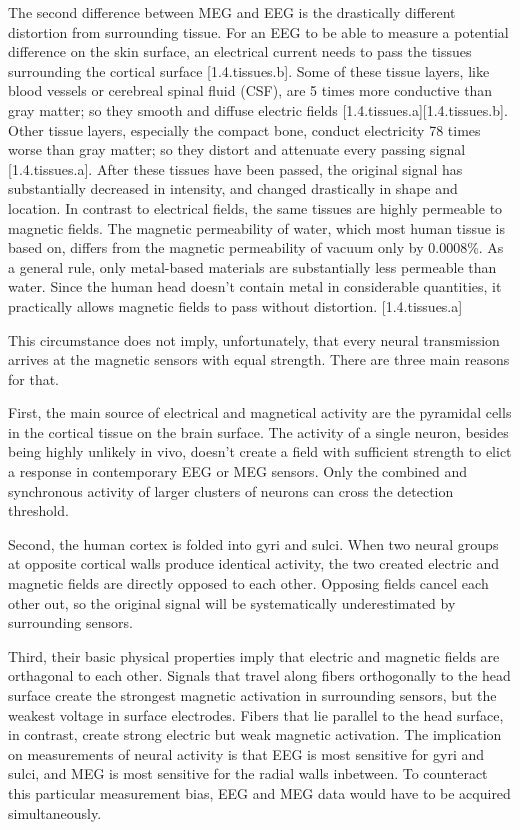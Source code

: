The second difference between MEG and EEG is the drastically different distortion from surrounding tissue.
For an EEG to be able to measure a potential difference on the skin surface, an electrical current needs to pass the tissues surrounding the cortical surface [1.4.tissues.b].
Some of these tissue layers, like blood vessels or cerebreal spinal fluid (CSF), are 5 times more conductive than gray matter; so they smooth and diffuse electric fields [1.4.tissues.a][1.4.tissues.b].
Other tissue layers, especially the compact bone, conduct electricity 78 times worse than gray matter; so they distort and attenuate every passing signal [1.4.tissues.a].
After these tissues have been passed, the original signal has substantially decreased in intensity, and changed drastically in shape and location.
In contrast to electrical fields, the same tissues are highly permeable to magnetic fields.
The magnetic permeability of water, which most human tissue is based on, differs from the magnetic permeability of vacuum only by 0.0008\%.
As a general rule, only metal-based materials are substantially less permeable than water.
Since the human head doesn't contain metal in considerable quantities, it practically allows magnetic fields to pass without distortion. [1.4.tissues.a]

This circumstance does not imply, unfortunately, that every neural transmission arrives at the magnetic sensors with equal strength.
There are three main reasons for that.

First, the main source of electrical and magnetical activity are the pyramidal cells in the cortical tissue on the brain surface.
The activity of a single neuron, besides being highly unlikely in vivo, doesn't create a field with sufficient strength to elict a response in contemporary EEG or MEG sensors.
Only the combined and synchronous activity of larger clusters of neurons can cross the detection threshold.

Second, the human cortex is folded into gyri and sulci.
When two neural groups at opposite cortical walls produce identical activity, the two created electric and magnetic fields are directly opposed to each other.
Opposing fields cancel each other out, so the original signal will be systematically underestimated by surrounding sensors.

Third, their basic physical properties imply that electric and magnetic fields are orthagonal to each other.
Signals that travel along fibers orthogonally to the head surface create the strongest magnetic activation in surrounding sensors, but the weakest voltage in surface electrodes.
Fibers that lie parallel to the head surface, in contrast, create strong electric but weak magnetic activation.
The implication on measurements of neural activity is that EEG is most sensitive for gyri and sulci, and MEG is most sensitive for the radial walls inbetween.
To counteract this particular measurement bias, EEG and MEG data would have to be acquired simultaneously.

